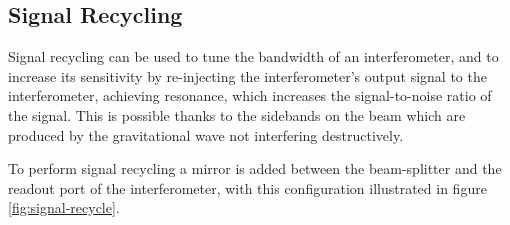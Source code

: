 \documentclass{kentigern}
\begin{document}
\subsection{Signal Recycling}
\label{sec:signal-recycling}
%
%
Signal recycling can be used to tune the bandwidth of an
interferometer, and to increase its sensitivity by re-injecting the
interferometer's output signal to the interferometer, achieving
resonance, which increases the signal-to-noise ratio of the
signal. This is possible thanks to the sidebands on the beam which are
produced by the gravitational wave not interfering destructively.

To perform signal recycling a mirror is added between the
beam-splitter and the readout port of the interferometer, with this
configuration illustrated in figure \ref{fig:signal-recycle}.
\end{document}
